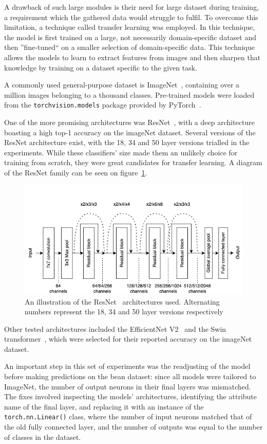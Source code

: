 A drawback of such large modules is their need for large dataset during training, a requirement which the gathered data would
struggle to fulfil.
To overcome this limitation, a technique called transfer learning was employed.
In this technique, the model is first trained on a large, not necessarily domain-specific dataset and then
''fine-tuned`` on a smaller selection of domain-specific data.
This technique allows the models to learn to extract features from images and then sharpen that knowledge by training on a dataset
specific to the given task.

A commonly used general-purpose dataset is ImageNet~\cite{imageNet}, containing over a million images belonging to a thousand
classes.
Pre-trained models were loaded from the \verb|torchvision.models| package provided by PyTorch~\cite{pytorchLibrary}.

One of the more promising architectures was ResNet~\cite{resNet}, with a deep architecture boasting a high top-1 accuracy on the imageNet dataset.
Several versions of the ResNet architecture exist, with the 18, 34 and 50 layer versions trialled in the experiments.
While these classifiers' size made them an unlikely choice for training from scratch, they were great candidates for transfer learning.
A diagram of the ResNet family can be seen on figure~\ref{fig:resnetSketch}.

\begin{figure}[!ht]
    \centering
    \includegraphics[width=\textwidth]{figures/methodology/resnet_diagram}
    \caption[An illustration of ResNet architectures]
    {An illustration of the ResNet~\cite{resNet} architectures used.
    Alternating numbers represent the 18, 34 and 50 layer versions respectively}
    \label{fig:resnetSketch}
\end{figure}

Other tested architectures included the EfficientNet V2~\cite{efficientNet} and the Swin transformer~\cite{swinTransformer},
which were selected for their reported accuracy on the imageNet dataset.

An important step in this set of experiments was the readjusting of the model before making predictions on the bean dataset:
since all models were tailored to ImageNet, the number of output neurons in their final layers was mismatched.
The fixes involved inspecting the models' architectures, identifying the attribute name of the final layer, and replacing it with an
instance of the \verb|torch.nn.Linear()| class, where the number of input neurons matched that of the old fully connected layer,
and the number of outputs was equal to the number of classes in the dataset.
